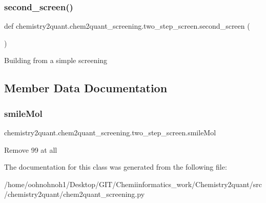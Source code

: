 \subsubsection{\texorpdfstring{second\+\_\+screen()}{second\_screen()}}
{\footnotesize\ttfamily def chemistry2quant.\+chem2quant\+\_\+screening.\+two\+\_\+step\+\_\+screen.\+second\+\_\+screen (\begin{DoxyParamCaption}{ }\end{DoxyParamCaption})}

\begin{DoxyVerb}Building from a simple screening
\end{DoxyVerb}
 

\subsection{Member Data Documentation}
\mbox{\label{classchemistry2quant_1_1chem2quant__screening_1_1two__step__screen_a6fde4c5a06a5d83ff1bad48186131072}} 
\subsubsection{\texorpdfstring{smile\+Mol}{smileMol}}
{\footnotesize\ttfamily chemistry2quant.\+chem2quant\+\_\+screening.\+two\+\_\+step\+\_\+screen.\+smile\+Mol}

\begin{DoxyVerb}Remove 99%
at all 
\end{DoxyVerb}
 

The documentation for this class was generated from the following file\+:\begin{DoxyCompactItemize}
\item 
/home/oohnohnoh1/\+Desktop/\+G\+I\+T/\+Chemiinformatics\+\_\+work/\+Chemistry2quant/src/chemistry2quant/chem2quant\+\_\+screening.\+py\end{DoxyCompactItemize}

